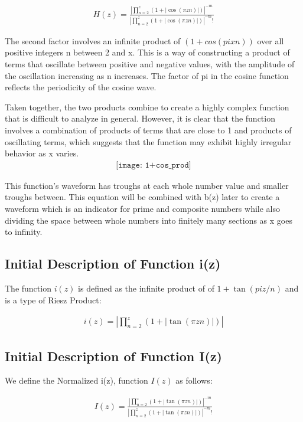 \documentclass{article}
\begin{document}
\begin{align*}
	H(z) = \frac{|\prod_{n=2}^z \left(1 + |\cos\left(\pi z n\right)|\right)|^{-m}}{|\prod_{n=2}^z \left(1 + |\cos\left(\pi z n\right)|\right)|^{-m}!}
\end{align*} 

The second factor involves an infinite product of $(1 + cos(pixn))$ over all positive integers n between 2 and x. This is a way of constructing a product of terms that oscillate between positive and negative values, with the amplitude of the oscillation increasing as n increases. The factor of pi in the cosine function reflects the periodicity of the cosine wave.

Taken together, the two products combine to create a highly complex function that is difficult to analyze in general. However, it is clear that the function involves a combination of products of terms that are close to 1 and products of oscillating terms, which suggests that the function may exhibit highly irregular behavior as x varies. \\

\begin{align*}
\texttt{[image: 1+cos\_prod]}
\end{align*}

This function's waveform has troughs at each whole number value and smaller troughs between. This equation will be combined with b(z) later to create a waveform which is an indicator for prime and composite numbers while also dividing the space between whole numbers into finitely many sections as x goes to infinity.

\subsection*{Initial Description of Function i(z)}
The function $i(z)$ is defined as the infinite product of  of $1 + \tan(piz/n)$ and is a type of Riesz Product:

\begin{align*}
	i(z) = |\prod_{n=2}^z \left(1 + |\tan\left(\pi z n\right)|\right)|
\end{align*}

\subsection*{Initial Description of Function I(z)}
We define the Normalized i(z), function $I(z)$ as follows:

\begin{align*}
	I(z) = \frac{|\prod_{n=2}^z \left(1 + |\tan\left(\pi z n\right)|\right)|^{-m}}{|\prod_{n=2}^z \left(1 + |\tan\left(\pi z n\right)|\right)|^{-m}!}
\end{align*} 
\end{document}
